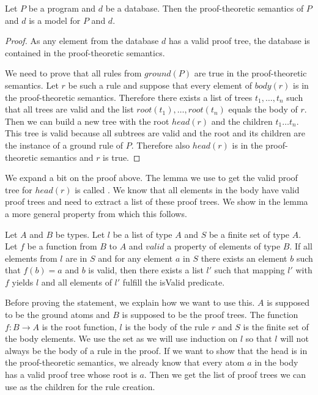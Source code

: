 \begin{lemma}[\proofTheoreticSemanticsIsModel]\label{lem:PTSModel}
    Let $P$ be a program and $d$ be a database. Then the proof-theoretic semantics of $P$ and $d$ is a model for $P$ and $d$.
\end{lemma}
\begin{proof}
    As any element from the database $d$ has a valid proof tree, the database is contained in the proof-theoretic semantics. 

    We need to prove that all rules from $ground(P)$ are true in the proof-theoretic semantics. Let $r$ be such a rule and suppose that every element of $body(r)$ is in the proof-theoretic semantics. Therefore there exists a list of trees $t_1, \dots ,t_n$ such that all trees are valid and the list $root(t_1), \dots ,root(t_n)$ equals the body of $r$. Then we can build a new tree with the root $head(r)$ and the children $t_1 \dots t_n$. This tree is valid because all subtrees are valid and the root and its children are the instance of a ground rule of $P$. Therefore also $head(r)$ is in the proof-theoretic semantics and $r$ is true.
\end{proof}

We expand a bit on the proof above. The lemma we use to get the valid proof tree for $head(r)$ is called \createProofTreeForRule. We know that all elements in the body have valid proof trees and need to extract a list of these proof trees. We show in the lemma \getTreeHelper a more general property from which this follows.

\begin{lemma}[\getTreeHelper]\label{lem:getTreeHelper}
    Let $A$ and $B$ be types. Let $l$ be a list of type $A$ and $S$ be a finite set of type $A$. Let $f$ be a function from $B$ to $A$ and $valid$ a property of elements of type $B$. If all elements from $l$ are in $S$ and for any element $a$ in $S$ there exists an element $b$ such that $f(b) = a $ and $b$ is valid, then there exists a list $l'$ such that mapping $l'$ with $f$ yields $l$ and all elements of $l'$ fulfill the isValid predicate.
\end{lemma}

Before proving the statement, we explain how we want to use this. $A$ is supposed to be the ground atoms and $B$ is supposed to be the proof trees. The function $f: B \to A$ is the root function, $l$ is the body of the rule $r$ and $S$ is the finite set of the body elements. We use the set as we will use induction on $l$ so that $l$ will not always be the body of a rule in the proof. If we want to show that the head is in the proof-theoretic semantics, we already know that every atom $a$ in the body has a valid proof tree whose root is $a$. Then we get the list of proof trees we can use as the children for the rule creation.

